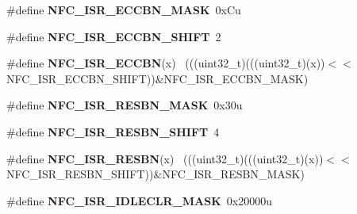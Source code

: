 \begin{DoxyCompactItemize}
\item 
\hypertarget{group___n_f_c___register___masks_ga3c6f3ae047ce8f687edbedab03515ba7}{}\#define {\bfseries N\+F\+C\+\_\+\+I\+S\+R\+\_\+\+E\+C\+C\+B\+N\+\_\+\+M\+A\+S\+K}~0x\+Cu\label{group___n_f_c___register___masks_ga3c6f3ae047ce8f687edbedab03515ba7}

\item 
\hypertarget{group___n_f_c___register___masks_gab7e7907750183ae6029f139cc186382f}{}\#define {\bfseries N\+F\+C\+\_\+\+I\+S\+R\+\_\+\+E\+C\+C\+B\+N\+\_\+\+S\+H\+I\+F\+T}~2\label{group___n_f_c___register___masks_gab7e7907750183ae6029f139cc186382f}

\item 
\hypertarget{group___n_f_c___register___masks_gadf477bf89a8fadf5402923ce8d98eb25}{}\#define {\bfseries N\+F\+C\+\_\+\+I\+S\+R\+\_\+\+E\+C\+C\+B\+N}(x)                                              ~(((uint32\+\_\+t)(((uint32\+\_\+t)(x))$<$$<$N\+F\+C\+\_\+\+I\+S\+R\+\_\+\+E\+C\+C\+B\+N\+\_\+\+S\+H\+I\+F\+T))\&N\+F\+C\+\_\+\+I\+S\+R\+\_\+\+E\+C\+C\+B\+N\+\_\+\+M\+A\+S\+K)\label{group___n_f_c___register___masks_gadf477bf89a8fadf5402923ce8d98eb25}

\item 
\hypertarget{group___n_f_c___register___masks_ga72009404f847174843d14a593979f37d}{}\#define {\bfseries N\+F\+C\+\_\+\+I\+S\+R\+\_\+\+R\+E\+S\+B\+N\+\_\+\+M\+A\+S\+K}~0x30u\label{group___n_f_c___register___masks_ga72009404f847174843d14a593979f37d}

\item 
\hypertarget{group___n_f_c___register___masks_ga8f423df7e838ce51b7aeb67de9e71d95}{}\#define {\bfseries N\+F\+C\+\_\+\+I\+S\+R\+\_\+\+R\+E\+S\+B\+N\+\_\+\+S\+H\+I\+F\+T}~4\label{group___n_f_c___register___masks_ga8f423df7e838ce51b7aeb67de9e71d95}

\item 
\hypertarget{group___n_f_c___register___masks_gaaf927b83ba82babb5ea1d54c37411a6f}{}\#define {\bfseries N\+F\+C\+\_\+\+I\+S\+R\+\_\+\+R\+E\+S\+B\+N}(x)                                              ~(((uint32\+\_\+t)(((uint32\+\_\+t)(x))$<$$<$N\+F\+C\+\_\+\+I\+S\+R\+\_\+\+R\+E\+S\+B\+N\+\_\+\+S\+H\+I\+F\+T))\&N\+F\+C\+\_\+\+I\+S\+R\+\_\+\+R\+E\+S\+B\+N\+\_\+\+M\+A\+S\+K)\label{group___n_f_c___register___masks_gaaf927b83ba82babb5ea1d54c37411a6f}

\item 
\hypertarget{group___n_f_c___register___masks_ga73ffa5c3d8bff6d57bbf95cd0ef8d66e}{}\#define {\bfseries N\+F\+C\+\_\+\+I\+S\+R\+\_\+\+I\+D\+L\+E\+C\+L\+R\+\_\+\+M\+A\+S\+K}~0x20000u\label{group___n_f_c___register___masks_ga73ffa5c3d8bff6d57bbf95cd0ef8d66e}


\end{DoxyCompactItemize}
